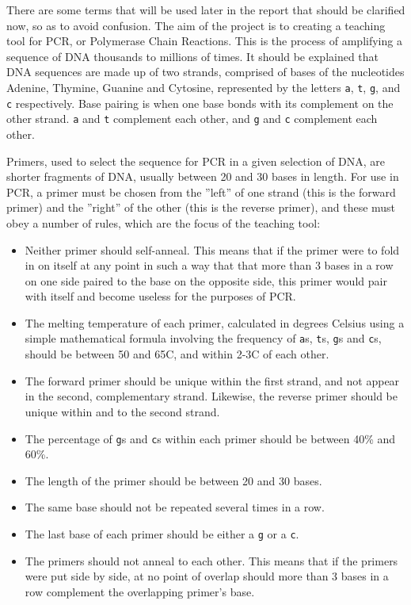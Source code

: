 There are some terms that will be used later in the report that should be 
clarified now, so as to avoid confusion. The aim of the project is to 
creating a teaching tool for PCR, or Polymerase Chain Reactions. This is 
the process of amplifying a sequence of DNA thousands to millions of times. 
It should be explained that DNA sequences are made up of two strands, 
comprised of bases of the nucleotides Adenine, Thymine, Guanine and 
Cytosine, represented by the letters \verb£a£, \verb£t£, \verb£g£, and 
\verb£c£ respectively. Base pairing is when one base bonds with its 
complement on the other strand. \verb£a£ and \verb£t£ complement each other, 
and \verb£g£ and \verb£c£ complement each other.

Primers, used to select the sequence for PCR in a given selection of DNA, 
are shorter fragments of DNA, usually between 20 and 30 bases in length. For
use in PCR, a primer must be chosen from the ''left'' of one strand (this is 
the forward primer) and the ''right'' of the other (this is the reverse 
primer), and these must obey a number of rules, which are the focus of the 
teaching tool:
\begin{itemize}
\item Neither primer should self-anneal. This means that if the primer were 
to fold in on itself at any point in such a way that that more than 3 bases 
in a row on one side paired to the base on the opposite side, this primer would 
pair with itself and become useless for the purposes of PCR.
\item The melting temperature of each primer, calculated in degrees Celsius 
using a simple mathematical formula involving the frequency of \verb£a£s, 
\verb£t£s, \verb£g£s and \verb£c£s, should be between 50 and 65\degree C, 
and within 2-3\degree C of each other.
\item The forward primer should be unique within the first strand, and not 
appear in the second, complementary strand. Likewise, the reverse primer 
should be unique within and to the second strand.
\item The percentage of \verb£g£s and \verb£c£s within each primer should 
be between 40\% and 60\%.
\item The length of the primer should be between 20 and 30 bases.
\item The same base should not be repeated several times in a row.
\item The last base of each primer should be either a \verb£g£ or a \verb£c£.
\item The primers should not anneal to each other. This means that if the 
primers were put side by side, at no point of overlap should more than 3 
bases in a row complement the overlapping primer’s base.
\end{itemize}

